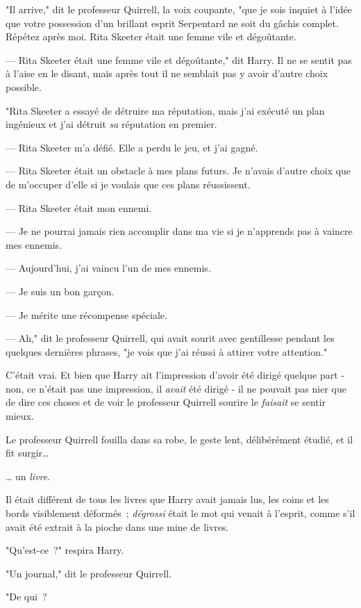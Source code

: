 "Il arrive," dit le professeur Quirrell, la voix coupante, "que je sois inquiet à l'idée que votre possession d'un brillant esprit Serpentard ne soit du gâchis complet. Répétez après moi. Rita Skeeter était une femme vile et dégoûtante.

--- Rita Skeeter était une femme vile et dégoûtante," dit Harry. Il ne se sentit pas à l'aise en le disant, mais après tout il ne semblait pas y avoir d'autre choix possible.

"Rita Skeeter a essayé de détruire ma réputation, mais j'ai exécuté un plan ingénieux et j'ai détruit \emph{sa} réputation en premier.

--- Rita Skeeter m'a défié. Elle a perdu le jeu, et j'ai gagné.

--- Rita Skeeter était un obstacle à mes plans futurs. Je n'avais d'autre choix que de m'occuper d'elle si je voulais que ces plans réussissent.

--- Rita Skeeter était mon ennemi.

--- Je ne pourrai jamais rien accomplir dans ma vie si je n'apprends pas à vaincre mes ennemis.

--- Aujourd'hui, j'ai vaincu l'un de mes ennemis.

--- Je suis un bon garçon.

--- Je mérite une récompense spéciale.

--- Ah," dit le professeur Quirrell, qui avait sourit avec gentillesse pendant les quelques dernières phrases, "je vois que j'ai réussi à attirer votre attention."

C'était vrai. Et bien que Harry ait l'impression d'avoir été dirigé quelque part - non, ce n'était pas une impression, il \emph{avait} été dirigé - il ne pouvait pas nier que de dire ces choses et de voir le professeur Quirrell sourire le \emph{faisait} se sentir mieux.

Le professeur Quirrell fouilla dans sa robe, le geste lent, délibérément étudié, et il fit surgir…

… un \emph{livre}.

Il était différent de tous les livres que Harry avait jamais lus, les coins et les bords visiblement déformés~; \emph{dégrossi} était le mot qui venait à l'esprit, comme s'il avait été extrait à la pioche dans une mine de livres.

"Qu'est-ce~?" respira Harry.

"Un journal," dit le professeur Quirrell.

"De qui~?

